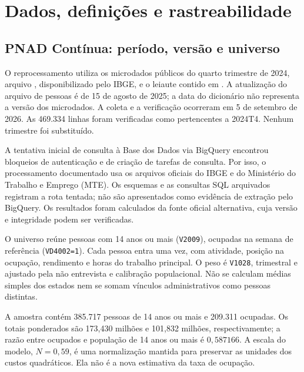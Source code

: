 \section{Dados, definições e rastreabilidade}\label{app:data}
\subsection{PNAD Contínua: período, versão e universo}
O reprocessamento utiliza os microdados públicos do quarto trimestre de 2024, arquivo , disponibilizado pelo IBGE, e o leiaute contido em  \citep{PNAD2024T4Microdados,PNADDicionario2022}. A atualização do arquivo de pessoas é de 15 de agosto de 2025; a data do dicionário não representa a versão dos microdados. A coleta e a verificação ocorreram em 5 de setembro de 2026. As 469.334 linhas foram verificadas como pertencentes a 2024T4. Nenhum trimestre foi substituído.

A tentativa inicial de consulta à Base dos Dados via BigQuery encontrou bloqueios de autenticação e de criação de tarefas de consulta. Por isso, o processamento documentado usa os arquivos oficiais do IBGE e do Ministério do Trabalho e Emprego (MTE). Os esquemas e as consultas SQL arquivados registram a rota tentada; não são apresentados como evidência de extração pelo BigQuery. Os resultados foram calculados da fonte oficial alternativa, cuja versão e integridade podem ser verificadas.

O universo reúne pessoas com 14 anos ou mais (\texttt{V2009}), ocupadas na semana de referência (\texttt{VD4002=1}). Cada pessoa entra uma vez, com atividade, posição na ocupação, rendimento e horas do trabalho principal. O peso é \texttt{V1028}, trimestral e ajustado pela não entrevista e calibração populacional. Não se calculam médias simples dos estados nem se somam vínculos administrativos como pessoas distintas.

A amostra contém 385.717 pessoas de 14 anos ou mais e 209.311 ocupadas. Os totais ponderados são 173,430 milhões e 101,832 milhões, respectivamente; a razão entre ocupados e população de 14 anos ou mais é $0{,}587166$. A escala do modelo, $N=0{,}59$, é uma normalização mantida para preservar as unidades dos custos quadráticos. Ela não é a nova estimativa da taxa de ocupação.


